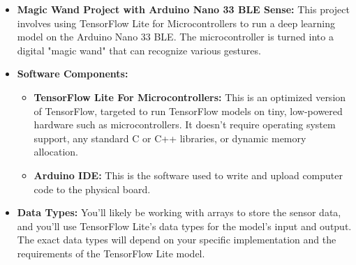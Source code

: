 \begin{itemize}
    \item \textbf{Magic Wand Project with Arduino Nano 33 BLE Sense:} This project involves using TensorFlow Lite for Microcontrollers to run a deep learning model on the Arduino Nano 33 BLE. The microcontroller is turned into a digital "magic wand" that can recognize various gestures.\cite{Fezari:2018}
    
    \item \textbf{Software Components:}
    \begin{itemize}
        \item \textbf{TensorFlow Lite For Microcontrollers:} This is an optimized version of TensorFlow, targeted to run TensorFlow models on tiny, low-powered hardware such as microcontrollers. It doesn't require operating system support, any standard C or C++ libraries, or dynamic memory allocation.
        \item \textbf{Arduino IDE:} This is the software used to write and upload computer code to the physical board.
    \end{itemize}
    
    \item \textbf{Data Types:} You'll likely be working with arrays to store the sensor data, and you'll use TensorFlow Lite's data types for the model's input and output. The exact data types will depend on your specific implementation and the requirements of the TensorFlow Lite model.
\end{itemize}


